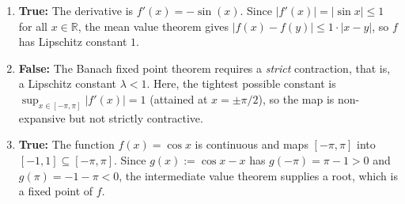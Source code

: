 \begin{exercisesolution}
\label{sol:examHS24_TF_banach}
\begin{enumerate}[label=\textbf{(\alph*)}]
  \item \textbf{True:} The derivative is $f'(x) = -\sin(x)$. Since $\lvert f'(x)\rvert = \lvert\sin x\rvert \le 1$ for all $x \in \mathbb{R}$, the mean value theorem gives $\lvert f(x) - f(y)\rvert \le 1 \cdot \lvert x-y\rvert$, so $f$ has Lipschitz constant $1$.
  \item \textbf{False:} The Banach fixed point theorem requires a \emph{strict} contraction, that is, a Lipschitz constant $\lambda < 1$. Here, the tightest possible constant is $\sup_{x \in [-\pi,\pi]} \lvert f'(x)\rvert = 1$ (attained at $x = \pm \pi/2$), so the map is non-expansive but not strictly contractive.
  \item \textbf{True:} The function $f(x) = \cos x$ is continuous and maps $[-\pi,\pi]$ into $[-1,1] \subseteq [-\pi,\pi]$. Since $g(x) := \cos x - x$ has $g(-\pi) = \pi - 1 > 0$ and $g(\pi) = -1 - \pi < 0$, the intermediate value theorem supplies a root, which is a fixed point of $f$.
\end{enumerate}
\end{exercisesolution}


